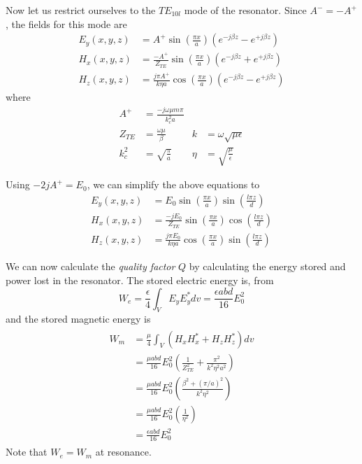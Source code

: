 Now let us restrict ourselves to the $TE_{10l}$ mode of the resonator. Since $A^-=-A^+$, the fields for this mode are
\begin{subequations}
\label{eqn:TE10l fields}
\begin{align}
E_y(x,y,z)& =A^+\sin\left(\frac{\pi x}{a}\right)(e^{-j\beta z}-e^{+j\beta z})\\
H_x(x,y,z)& =\frac{-A^+}{Z_{TE}}\sin\left(\frac{\pi x}{a}\right)(e^{-j\beta z}+e^{+j\beta z})\\
H_z(x,y,z)& =\frac{j\pi A^+}{k\eta a}\cos\left(\frac{\pi x}{a}\right)(e^{-j\beta z}-e^{+j\beta z})
\end{align}
\end{subequations}
where
\begin{subequations}
\begin{align*}
A^+& =\frac{-j\omega\mu m\pi}{k_c^2a}\\
Z_{TE}& =\frac{\omega\mu}{\beta}& 
k& =\omega\sqrt{\mu\epsilon}\\
k_c^2& =\sqrt{\frac{\pi}{a}}& 
\eta& =\sqrt{\frac{\mu}{\epsilon}}
\end{align*}
\end{subequations}

Using $-2jA^+=E_0$, we can simplify the above equations to
\begin{subequations}
\begin{align}
E_y(x,y,z)& =E_0\sin\left(\frac{\pi x}{a}\right)\sin\left(\frac{l\pi z}{d}\right)\\
H_x(x,y,z)& =\frac{-jE_0}{Z_{TE}}\sin\left(\frac{\pi x}{a}\right)\cos\left(\frac{l\pi z}{d}\right)\\
H_z(x,y,z)& =\frac{j\pi E_0}{k\eta a}\cos\left(\frac{\pi x}{a}\right)\sin\left(\frac{l\pi z}{d}\right)
\end{align}
\end{subequations}

We can now calculate the \textit{quality factor} $Q$ by calculating the energy stored and power lost in the resonator.
The stored electric energy is, from \cite{Pozar2009}
\begin{equation}
W_e=\frac{\epsilon}{4}\int_V E_yE_y^*dv = \frac{\epsilon abd}{16}E_0^2
\end{equation}
and the stored magnetic energy is
\begin{align}
\begin{split}
W_m&=\frac{\mu}{4}\int_V (H_xH_x^*+H_zH_z^*)dv\\
&= \frac{\mu abd}{16}E_0^2\left(\frac{1}{Z_{TE}^2}+\frac{\pi^2}{k^2\eta^2a^2}\right)\\
&=\frac{\mu abd}{16}E_0^2\left(\frac{\beta^2+(\pi/a)^2}{k^2\eta^2}\right)\\
&=\frac{\mu abd}{16}E_0^2\left(\frac{1}{\eta^2}\right)\\
&=\frac{\epsilon abd}{16}E_0^2
\end{split}
\end{align}
Note that $W_e=W_m$ at resonance.

